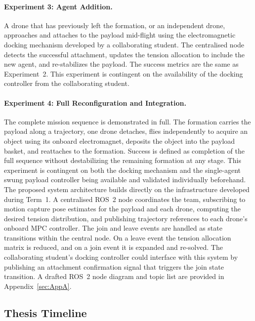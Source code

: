 \paragraph{Experiment 3: Agent Addition.}
A drone that has previously left the formation, or an independent drone, approaches and attaches to the payload mid-flight using the electromagnetic docking mechanism developed by a collaborating student. The centralised node detects the successful attachment, updates the tension allocation to include the new agent, and re-stabilizes the payload. The success metrics are the same as Experiment~2. This experiment is contingent on the availability of the docking controller from the collaborating student.

\paragraph{Experiment 4: Full Reconfiguration and Integration.}
The complete mission sequence is demonstrated in full. The formation carries the payload along a trajectory, one drone detaches, flies independently to acquire an object using its onboard electromagnet, deposits the object into the payload basket, and reattaches to the formation. Success is defined as completion of the full sequence without destabilizing the remaining formation at any stage. This experiment is contingent on both the docking mechanism and the single-agent swung payload controller being available and validated individually beforehand. \\

The proposed system architecture builds directly on the infrastructure developed during Term~1. A centralised ROS~2 node coordinates the team, subscribing to motion capture pose estimates for the payload and each drone, computing the desired tension distribution, and publishing trajectory references to each drone's onboard MPC controller. The join and leave events are handled as state transitions within the central node. On a leave event the tension allocation matrix is reduced, and on a join event it is expanded and re-solved. The collaborating student's docking controller could interface with this system by publishing an attachment confirmation signal that triggers the join state transition. A drafted ROS~2 node diagram and topic list are provided in Appendix~\ref{sec:AppA}.
\newpage
\subsection{Thesis Timeline}

